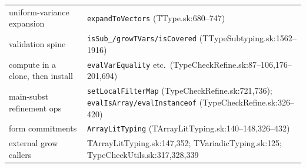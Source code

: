 \documentclass[11pt]{article}
\begin{document}
\begin{center}
\begin{tabular}{@{}>{\raggedright\arraybackslash}p{4.8cm}@{\quad}>{\raggedright\arraybackslash}p{9.8cm}@{}}
uniform-variance expansion & \texttt{expandToVectors}
  (TType.sk:680--747) \\
validation spine & \texttt{isSub\_/growTVars/isCovered}
  (TTypeSubtyping.sk:1562--1916) \\
compute in a clone, then install & \texttt{evalVarEquality} etc.\
  (TypeCheckRefine.sk:87--106,176--201,694) \\
main-subst refinement ops & \texttt{setLocalFilterMap}
  (TypeCheckRefine.sk:721,736); \texttt{evalIsArray/evalInstanceof}
  (TypeCheckRefine.sk:326--420) \\
form commitments & \texttt{ArrayLitTyping}
  (TArrayLitTyping.sk:140--148,326--432) \\
external grow callers & TArrayLitTyping.sk:147,352;
  TVariadicTyping.sk:125; TypeCheckUtils.sk:317,328,339 \\
\bottomrule
\end{tabular}
\end{center}
\end{document}
